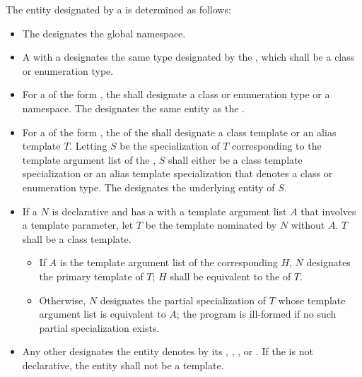 \pnum
The entity designated by a 
is determined as follows:
\begin{itemize}
\item
The  \tcode{::} designates
the global namespace.
\item
A  with a 
designates the same type designated by the ,
which shall be a class or enumeration type.
\item
For a  of
the form ,
the  shall designate
a class or enumeration type or a namespace.
The  designates the same entity
as the .
\item
For a  of
the form
,
the  of
the  shall designate
a class template or an alias template $T$.
Letting $S$ be the specialization of $T$
corresponding to the template argument list of
the ,
$S$ shall either be a class template specialization or
an alias template specialization that denotes a class or enumeration type.
The  designates the underlying entity of $S$.
\item
If a  $N$
is declarative and
has a  with a template argument list $A$
that involves a template parameter,
let $T$ be the template nominated by $N$ without $A$.
$T$ shall be a class template.
\begin{itemize}
\item
If $A$ is the template argument list of
the corresponding  $H$,
$N$ designates the primary template of $T$;
$H$ shall be equivalent to
the  of $T$.
\item
Otherwise, $N$ designates the partial specialization of $T$
whose template argument list is equivalent to $A$;
the program is ill-formed if no such partial specialization exists.
\end{itemize}
\item
Any other  designates
the entity denotes by its
,
,
, or
.
If the  is not declarative,
the entity shall not be a template.
\end{itemize}

